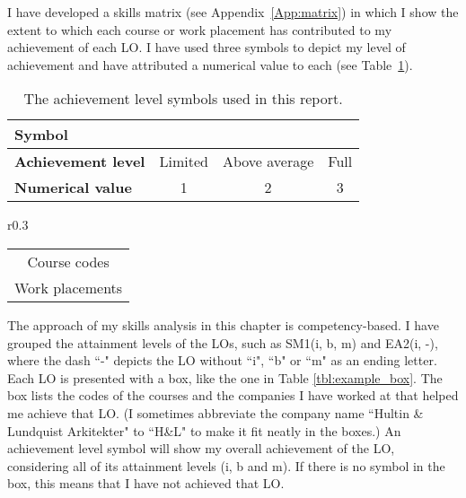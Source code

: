 I have developed a skills matrix (see Appendix~\ref{App:matrix}) in which I show the extent to which each course or work placement has contributed to my achievement of each LO.
I have used three symbols to depict my level of achievement
and have attributed a numerical value to each (see Table~\ref{tbl:symbols}).


\begin{table}[htbp]
	\caption{The achievement level symbols used in this report.}
	\label{tbl:symbols}
	\centering
	\begin{tabular}{@{}lccc@{}}
		\toprule
		\textbf{Symbol} & \littlemaster & \nomaster & \master \\ \midrule
		\textbf{Achievement level} & Limited & Above average & Full \\
		\textbf{Numerical value} & 1 & 2 & 3 \\ \bottomrule
	\end{tabular}
\end{table}



\begin{wraptable}[5]{r}{0.3\textwidth}
	\centering
	\caption{Example box}
	\label{tbl:example_box}
	\begin{tabular}{|c|}
		\hline
		\rowcolor[HTML]{F8A102} 
		\multicolumn{1}{|c|}{\cellcolor[HTML]{F8A102}\textbf{LO(i, b, m) \littlemaster / \nomaster / \master}} \\ \hline
		Course codes \\
		Work placements \\ \hline
	\end{tabular}
\end{wraptable}

The approach of my skills analysis in this chapter is competency-based.
I have grouped the attainment levels of the LOs, such as SM1(i, b, m) and EA2(i, -), where the dash ``-" depicts the LO without ``i", ``b" or ``m" as an ending letter.
Each LO is presented with a box, like the one in Table \ref{tbl:example_box}.
The box lists the codes of the courses and the companies I have worked at that helped me achieve that LO.
(I sometimes abbreviate the company name ``Hultin \& Lundquist Arkitekter" to ``H\&L" to make it fit neatly in the boxes.)
An achievement level symbol will show my overall achievement of the LO, considering all of its attainment levels (i, b and m).
If there is no symbol in the box, this means that I have not achieved that LO.

